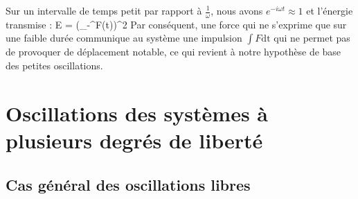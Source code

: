 Sur un intervalle de temps petit par rapport \`a $\frac{1}{\omega}$, nous avons $e^{-i\omega t} \approx 1$ et l'\'energie transmise :
\benn
	E =  \left(\int_{-\infty}^{\infty}{F(t)}\right)^{2}
\eenn
Par cons\'equent, une force qui ne s'exprime que sur une faible dur\'ee communique au syst\`eme une impulsion $\int F\mathrm{dt}$ qui ne permet pas de provoquer de d\'eplacement notable, ce qui revient \`a notre hypoth\`ese de base des petites oscillations.

\section{Oscillations des syst\`emes \`a plusieurs degr\'es de libert\'e}

\subsection{Cas g\'en\'eral des oscillations libres}

